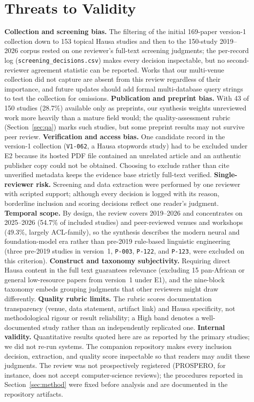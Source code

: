 \documentclass[sn-basic,pdflatex]{sn-jnl}
\begin{document}
\section{Threats to Validity}\label{sec:threats}
\textbf{Collection and screening bias.} The filtering of the initial 169-paper version-1 collection down to 153 topical Hausa studies and then to the 150-study 2019--2026 corpus rested on one reviewer's full-text screening judgments; the per-record log (\texttt{screening\_decisions.csv}) makes every decision inspectable, but no second-reviewer agreement statistic can be reported. Works that our multi-venue collection did not capture are absent from this review regardless of their importance, and future updates should add formal multi-database query strings to test the collection for omissions. \textbf{Publication and preprint bias.} With 43 of 150 studies (28.7\%) available only as preprints, our synthesis weights unreviewed work more heavily than a mature field would; the quality-assessment rubric (Section~\ref{sec:qa}) marks such studies, but some preprint results may not survive peer review. \textbf{Verification and access bias.} One candidate record in the version-1 collection (\texttt{V1-062}, a Hausa stopwords study) had to be excluded under E2 because its hosted PDF file contained an unrelated article and an authentic publisher copy could not be obtained. Choosing to exclude rather than cite unverified metadata keeps the evidence base strictly full-text verified. \textbf{Single-reviewer risk.} Screening and data extraction were performed by one reviewer with scripted support; although every decision is logged with its reason, borderline inclusion and scoring decisions reflect one reader's judgment. \textbf{Temporal scope.} By design, the review covers 2019--2026 and concentrates on 2025--2026 (54.7\% of included studies) and peer-reviewed venues and workshops (49.3\%, largely ACL-family), so the synthesis describes the modern neural and foundation-model era rather than pre-2019 rule-based linguistic engineering (three pre-2019 studies in version~1, \texttt{P-003}, \texttt{P-122}, and \texttt{P-123}, were excluded on this criterion). \textbf{Construct and taxonomy subjectivity.} Requiring direct Hausa content in the full text guarantees relevance (excluding 15 pan-African or general low-resource papers from version~1 under E1), and the nine-block taxonomy embeds grouping judgments that other reviewers might draw differently. \textbf{Quality rubric limits.} The rubric scores documentation transparency (venue, data statement, artifact link) and Hausa specificity, not methodological rigour or result reliability; a High band denotes a well-documented study rather than an independently replicated one. \textbf{Internal validity.} Quantitative results quoted here are as reported by the primary studies; we did not re-run systems. The companion repository makes every inclusion decision, extraction, and quality score inspectable so that readers may audit these judgments. The review was not prospectively registered (PROSPERO, for instance, does not accept computer-science reviews); the procedures reported in Section~\ref{sec:method} were fixed before analysis and are documented in the repository artifacts.
\end{document}
